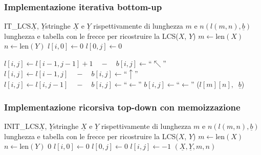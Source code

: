 \subsubsection*{Implementazione iterativa bottom-up}
\vspace{-7pt}
\begin{algo}{IT\_LCS}{$\underline{X}$, $\underline{Y}$}{stringhe $\underline{X}$ e $\underline{Y}$ rispettivamente di lunghezza $m$ e $n$}{$(l(m, n), \underline{b})$ lunghezza e tabella con le frecce per ricostruire la LCS($X$, $Y$)}
	\State \(m \gets \text{len}(X)\)
	\State \(n \gets \text{len}(Y)\)
	 \(l[i, 0] \gets 0\)  \EndFor
	 \(l[0, j] \gets 0\)  \EndFor

	\State
	 
			 
				\State \(l[i, j] \gets l[i-1, j-1] + 1 \quad-\quad b[i, j] \gets \text{``}\nwarrow\text{''}\)
			 
				\State \(l[i, j] \gets l[i-1, j] \quad-\quad b[i, j] \gets \text{``}\uparrow\text{''}\)
			 
				\State \(l[i, j] \gets l[i, j-1] \quad-\quad b[i, j] \gets \text{``}\leftarrow\text{''}\)
				\State \(b[i, j] \gets \text{``}\leftarrow\text{''}\)
			\EndIf
		\EndFor
	\EndFor
	\State \Return (\(l[m][n], \;\; \underline{b}\))
\end{algo}

\subsubsection*{Implementazione ricorsiva top-down con memoizzazione}
\vspace{-7pt}
\begin{algo}{INIT\_LCS}{$\underline{X}$, $\underline{Y}$}{stringhe $\underline{X}$ e $\underline{Y}$ rispettivamente di lunghezza $m$ e $n$}{$(l(m, n), \underline{b})$ lunghezza e tabella con le frecce per ricostruire la LCS($X$, $Y$)}
	\State \(m \gets \text{len}(X)\)
	\State \(n \gets \text{len}(Y)\)
	 
		\State \Return \(0\)
	\EndIf
	 \(l[i, 0] \gets 0\)  \EndFor
	 \(l[0, j] \gets 0\)  \EndFor
	 
		 
			\State \(l[i,j] \gets -1\)
		\EndFor
	\EndFor
	\State \Return {}\((\underline{X}, \underline{Y},m, n)\)
\end{algo}

